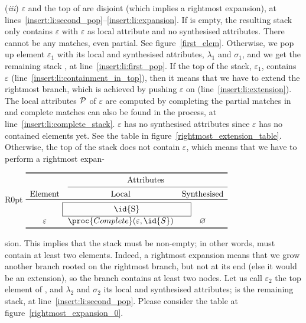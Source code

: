 (\emph{iii}) \(\varepsilon\) and the top of  are disjoint (which
implies a rightmost expansion), at
lines~\ref{insert:li:second_pop}--\ref{insert:li:expansion}. If 
is empty, the resulting stack only contains \(\varepsilon\) with
\(\varepsilon\) as local attribute and no synthesised
attributes. There cannot be any matches, even partial. See
figure~\ref{first_elem}. Otherwise, we pop up element
\(\varepsilon_1\) with its local and synthesised attributes,
\(\lambda_1\) and \(\sigma_1\), and we get the remaining stack
, at line~\ref{insert:li:first_pop}. If the top of the stack,
\(\varepsilon_1\), contains \(\varepsilon\)
(line~\ref{insert:li:containment_in_top}), then it means that we have
to extend the rightmost branch, which is achieved by pushing
\(\varepsilon\) on  (line~\ref{insert:li:extension}). The local
attributes \(\cal P\) of \(\varepsilon\) are computed by completing
the partial matches in  and complete matches can also be found
in the process, at line~\ref{insert:li:complete_stack}.
\(\varepsilon\) has no synthesised attributes since \(\varepsilon\)
has no contained elements yet. See the table in
figure~\ref{rightmost_extension_table}. Otherwise, the top of the
stack does not contain \(\varepsilon\), which means that we have to
perform a rightmost expan-

\begin{wrapfigure}[8]{R}{0pt}
\(
\begin{array}{ccc}
\toprule
& \multicolumn{2}{c}{\text{Attributes}}\\
\cmidrule(l){2-3}
\text{Element} & \text{Local} & \text{Synthesised}\\
\toprule
\multicolumn{3}{c}{\framebox[55mm][c]{\id{S}}}\\
\varepsilon & \proc{Complete} (\varepsilon, \id{S}) & \varnothing\\
\bottomrule
\end{array}
\)
\caption{Rightmost extension.}
\label{rightmost_extension_table}
\end{wrapfigure}
\noindent sion. This implies that the stack  must be
non\hyp{}empty; in other words,  must contain at least two
elements. Indeed, a rightmost expansion means that we grow another
branch rooted on the rightmost bran\-ch, but not at its end (else it
would be an extension), so the branch contains at least two nodes. Let
us call \(\varepsilon_2\) the top element of , and
\(\lambda_2\) and \(\sigma_2\) its local and synthesised attributes;
 is the remaining stack, at
line~\ref{insert:li:second_pop}. Please consider the table at
figure~\ref{rightmost_expansion_0}.

